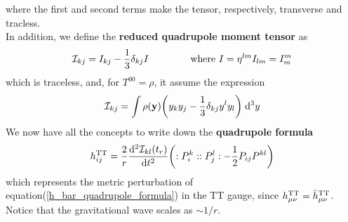 where the first and second terms make the tensor, respectively, transverse and tracless.\\
In addition, we define the \textbf{reduced quadrupole moment tensor} as
\begin{equation}
\label{reduced_quadrupole_moment_tensor}
\mathcal{I}_{kj} = I_{kj} - \dfrac{1}{3} \delta_{kj} I \hspace{1.5cm} \text{where } I=\eta^{ l m} I_{l m} = I^{m} _{m}
\end{equation}
which is traceless, and, for $T^{00} = \rho$, it assume the expression
\[
\mathcal{I} _{kj} = \int \rho(\vb{y}) \qty(y_{k} y_{j} - \dfrac{1}{3}\delta_{kj} y^{l} y_{l} ) \; \dd[3] y
\]
We now have all the concepts to write down 
the \textbf{quadrupole formula}
\begin{equation}
\label{h_TT_quadrupole_formula}
h^{\text{TT}}_{ij} = \dfrac{2}{r} \dv[2]{\mathcal{I}_{kl}(t_r)}{t} \qty(:P_{i}^{k}::P_{j}^{l}: - \dfrac{1}{2} P_{ij} P^{kl})
\end{equation}
which represents the metric perturbation of equation(\ref{h_bar_quadrupole_formula}) in the TT gauge, since $h^{\text{TT}}_{\mu \nu} = \bar{h} ^{\text{TT}}_{\mu \nu}$.
Notice that the gravitational wave scales as $\sim 1/r$.
\\


